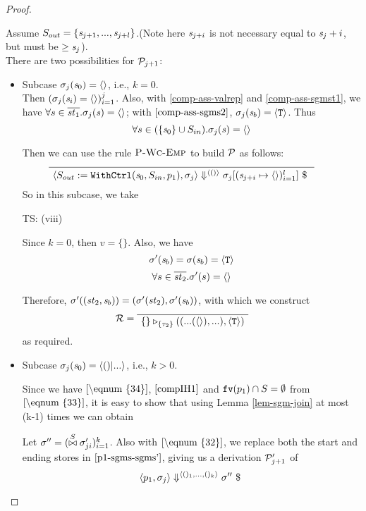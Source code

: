 \begin{proof}
\begin{itemize}
\begin{enumerate}[(i)]
	Assume $S_{out} = \{\mathit{s}_{j+1},...,\mathit{s}_{j+l}\}$.(Note here $\mathit{s}_{j+i}$ is not necessary equal to $\mathit{s}_j + i$, but must be $\ge \mathit{s}_j$). \\
	
	There are two possibilities for $\mathcal{P}_{j+1}$:
	\begin{itemize}
	\item 
	Subcase $\sigma_j(\mathit{s}_0) = \langle \rangle$, i.e., $k = 0$.\\
	Then $(\sigma_j(\mathit{s}_i) = \langle \rangle)^j_{i=1}$. Also, with \eqref{comp-ass-valrep} and \eqref{comp-ass-sgmst1}, we have 
	$\forall s \in \overline{\mathit{st}_1}. \sigma_j(\mathit{s}) = \langle \rangle$; 
	with $\eqref{comp-ass-sgms2}$, $\sigma_j(\mathit{s}_b) = \langle \mathtt{T} \rangle $.
	Thus $$\forall s \in (\{\mathit{s}_0\} \cup S_{in}). \sigma_j(\mathit{s}) = \langle \rangle$$ 
	
	Then we can use the rule $\textsc{P-Wc-Emp}$ to build $\mathcal{P}$ as follows:
	$$\PT{
		\Axiom{\seval{\wcdef}{\sgm_j}{\< () \'>}
			   {\sgm_j[\l{\s_{j+i} \|-> \emptyv}]}}
	  }$$ 
    So in this subcase, we take 
	
	TS: (viii)
	\def\sgmpempty{\sgm[\s_0 \|-> \emptyv, \s_1' \|-> \emptyv, ..., \s_j' \|-> \emptyv]}

	Since $k=0$, then $v = \{ \}$. Also, we have 
	$$\sigma'(\mathit{s}_b) = \sigma(\mathit{s}_b) = \langle \mathtt{T} \rangle$$
	$$\forall s \in \overline{\mathit{st}_2}. \sigma'(s) = \langle \rangle$$ 
	
	Therefore, $\sigma'((\mathit{st}_2,\mathit{s}_b)) = (\sigma'(\mathit{st}_2), \sigma'(\mathit{s}_b))$, with which we construct 
	$$\MR = 
	\PT{\Axiom{\ValRep{\{\}}{\tseq{\tau_2}}{((...(\emptyv),...),\oT)}}}$$ 
	as required.\\
    
\def\sgmp-nonempty{\sgm[\s_0 \|-> \kunit, \s_1' \|-> \sgm''(\s'_1),...,
	\s'_j \|-> \sgm''(\s'_j)]}  

	\item \label{subcase-2} 
	Subcase $\sgm_j(\s_0) = \<()|...\'>$, i.e., $k > 0$.
	
    Since we have $\eqref{\eqnum{34}}$, $\eqref{compIH1}$ and  $\mathtt{fv}(p_1) \cap S = \emptyset$ from $\eqref{\eqnum{33}}$,
	it is easy to show that using Lemma \ref{lem-sgm-join} at most (k-1) times we can obtain

    Let $\sigma'' = (\stackrel{S}{\bowtie} \sigma_{ji}')^k_{i=1}$. Also with $\eqref{\eqnum{32}}$, we replace both the start and ending stores in $\eqref{p1-sgms-sgms'}$, giving us 
    a derivation $\mathcal{P}_{j+1}'$ of
    $$\seval{p_1}{\sgm_j}{\kunit}{\sgm''}$$
	

\end{itemize}
\end{enumerate}
\end{itemize}
\end{proof}
